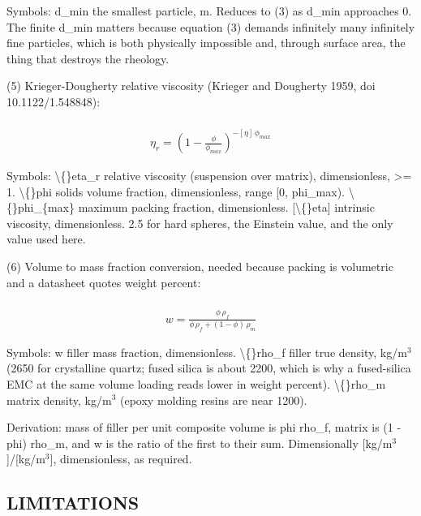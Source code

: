 \documentclass[10pt,a4paper,twoside]{report}
\begin{document}
Symbols: d\_min the smallest particle, m. Reduces to (3) as d\_min approaches 0. The finite d\_min matters because equation (3) demands infinitely many infinitely fine particles, which is both physically impossible and, through surface area, the thing that destroys the rheology.

(5) Krieger-Dougherty relative viscosity (Krieger and Dougherty 1959, doi 10.1122/1.548848):

\begin{equation*}
\begin{gathered}
\\ \eta_r = \left(1 - \frac{\phi}{\phi_{max}}\right)^{-[\eta]\,\phi_{max}}
\end{gathered}
\end{equation*}

Symbols: \textbackslash\{\}eta\_r      relative viscosity (suspension over matrix), dimensionless, >= 1. \textbackslash\{\}phi        solids volume fraction, dimensionless, range [0, phi\_max). \textbackslash\{\}phi\_\{max\}  maximum packing fraction, dimensionless. [\textbackslash\{\}eta]      intrinsic viscosity, dimensionless. 2.5 for hard spheres, the Einstein value, and the only value used here.

(6) Volume to mass fraction conversion, needed because packing is volumetric and a datasheet quotes weight percent:

\begin{equation*}
\begin{gathered}
\\ w = \frac{\phi\,\rho_f}{\phi\,\rho_f + (1 - \phi)\,\rho_m}
\end{gathered}
\end{equation*}

Symbols: w        filler mass fraction, dimensionless. \textbackslash\{\}rho\_f   filler true density, kg/m$^{3}$ (2650 for crystalline quartz; fused silica is about 2200, which is why a fused-silica EMC at the same volume loading reads lower in weight percent). \textbackslash\{\}rho\_m   matrix density, kg/m$^{3}$ (epoxy molding resins are near 1200).

Derivation: mass of filler per unit composite volume is phi rho\_f, matrix is (1 - phi) rho\_m, and w is the ratio of the first to their sum. Dimensionally [kg/m$^{3}$]/[kg/m$^{3}$], dimensionless, as required.

\subsection*{LIMITATIONS}
\end{document}
